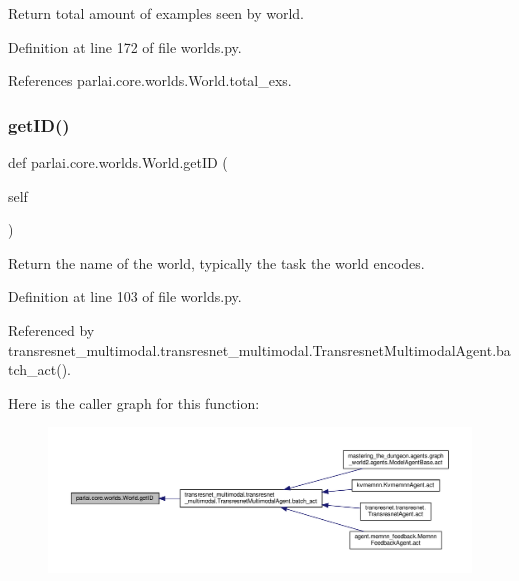 \begin{DoxyVerb}Return total amount of examples seen by world.\end{DoxyVerb}
 

Definition at line 172 of file worlds.\+py.



References parlai.\+core.\+worlds.\+World.\+total\+\_\+exs.

\mbox{\label{classparlai_1_1core_1_1worlds_1_1World_a5ef8bd0bc50edb86ef87e4a3e72b6192}} 
\subsubsection{\texorpdfstring{get\+I\+D()}{getID()}}
{\footnotesize\ttfamily def parlai.\+core.\+worlds.\+World.\+get\+ID (\begin{DoxyParamCaption}\item[{}]{self }\end{DoxyParamCaption})}

\begin{DoxyVerb}Return the name of the world, typically the task the world encodes.\end{DoxyVerb}
 

Definition at line 103 of file worlds.\+py.



Referenced by transresnet\+\_\+multimodal.\+transresnet\+\_\+multimodal.\+Transresnet\+Multimodal\+Agent.\+batch\+\_\+act().

Here is the caller graph for this function\+:
\nopagebreak
\begin{figure}[H]
\begin{center}
\leavevmode
\includegraphics[width=350pt]{classparlai_1_1core_1_1worlds_1_1World_a5ef8bd0bc50edb86ef87e4a3e72b6192_icgraph}
\end{center}
\end{figure}
\mbox{\label{classparlai_1_1core_1_1worlds_1_1World_a7c7258c4ad6a6bdfc76287832876a25d}} 
